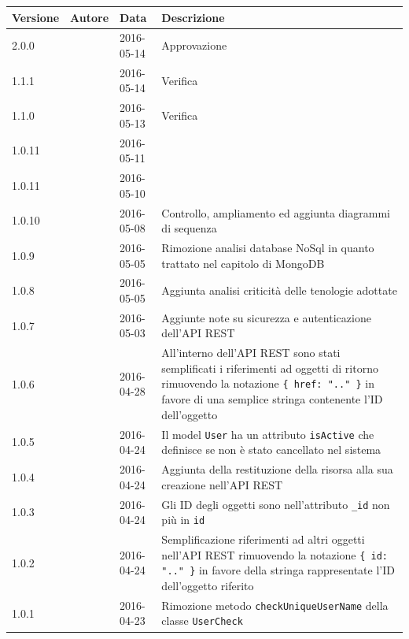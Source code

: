 \documentclass[12pt,a4paper]{article}
\begin{document}
\begin{center}
	\begin{longtable}[H]{p{} p{} p{} p{}}
		\toprule
		\textbf{Versione}	&	\textbf{Autore}	&	\textbf{Data}	&	\textbf{Descrizione}\\*
		\midrule
		\midrule
		2.0.0 & \AVE & 2016-05-14 & Approvazione \\*
		\midrule
		1.1.1 & \WS & 2016-05-14 & Verifica \\*
		\midrule
		1.1.0 & \NDC & 2016-05-13 & Verifica \\*
		\midrule
		1.0.11 & \TODO{} & 2016-05-11 &  \\*
		\midrule
		1.0.11 & \TODO{} & 2016-05-10 &  \\*
		\midrule
		1.0.10 & \TODO{} & 2016-05-08 & Controllo, ampliamento ed aggiunta diagrammi di sequenza \\*
		\midrule
		1.0.9 & \TODO{} & 2016-05-05 & Rimozione analisi database NoSql in quanto trattato nel capitolo di MongoDB \\*
		\midrule
		1.0.8 & \TODO{} & 2016-05-05 & Aggiunta analisi criticità delle tenologie adottate \\*
		\midrule
		1.0.7 & \TP{} & 2016-05-03 & Aggiunte note su sicurezza e autenticazione dell'API REST \\*
		\midrule
		1.0.6 & \TP{} & 2016-04-28 & All'interno dell'API REST sono stati semplificati i riferimenti ad oggetti di ritorno rimuovendo la notazione \texttt{\{ href: ".." \}} in favore di una semplice stringa contenente l'ID dell'oggetto \\*
		\midrule
		1.0.5 & \TP{} & 2016-04-24 & Il model \texttt{User} ha un attributo \texttt{isActive} che definisce se non è stato cancellato nel sistema \\*
		\midrule
		1.0.4 & \TP{} & 2016-04-24 & Aggiunta della restituzione della risorsa alla sua creazione nell'API REST \\*
		\midrule
		\midrule
		1.0.3 & \TP{} & 2016-04-24 & Gli ID degli oggetti sono nell'attributo \texttt{\_id} non più in \texttt{id} \\*
		\midrule
		1.0.2 & \TP{} & 2016-04-24 & Semplificazione riferimenti ad altri oggetti nell'API REST
			rimuovendo la notazione \texttt{\{ id: ".." \}} in favore della stringa rappresentate l'ID dell'oggetto
			riferito \\*
		\midrule
		1.0.1 & \TP{} & 2016-04-23 & Rimozione metodo \texttt{checkUniqueUserName} della classe
			\texttt{UserCheck} \\*

\end{longtable}
\end{center}
\end{document}
